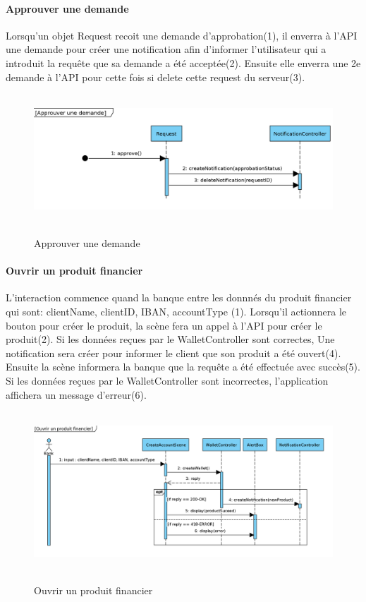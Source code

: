 \documentclass{article}
\begin{document}
\newpage

\paragraph{Approuver une demande}
Lorsqu'un objet Request recoit une demande d'approbation(1), il enverra à l'API une demande pour créer
une notification afin d'informer l'utilisateur qui a introduit la requête que sa demande a été acceptée(2).
Ensuite elle enverra une 2e demande à l'API pour cette fois si delete cette request du serveur(3).

\begin{figure}[h!]
    \hbox{
        \centering\includegraphics[width=\linewidth]{../img/sequence-institution-img2.png}%
    }
    \caption{Approuver une demande}
\end{figure}

\newpage

\paragraph{Ouvrir un produit financier}
L'interaction commence quand la banque entre les donnnés du produit financier qui sont: clientName,
clientID, IBAN, accountType (1). Lorsqu'il actionnera le bouton pour créer le produit, la scène fera
un appel à l'API pour créer le produit(2). Si les données reçues par le WalletController sont correctes,
Une notification sera créer pour informer le client que son produit a été ouvert(4). Ensuite la scène
informera la banque que la requête a été effectuée avec succès(5). Si les données reçues par le
WalletController sont incorrectes, l'application affichera un message d'erreur(6). 

\begin{figure}[h!]
    \hbox{
        \centering\includegraphics[width=\linewidth]{../img/sequence-institution-img3.png}%
    }
    \caption{Ouvrir un produit financier}
\end{figure}
\end{document}
